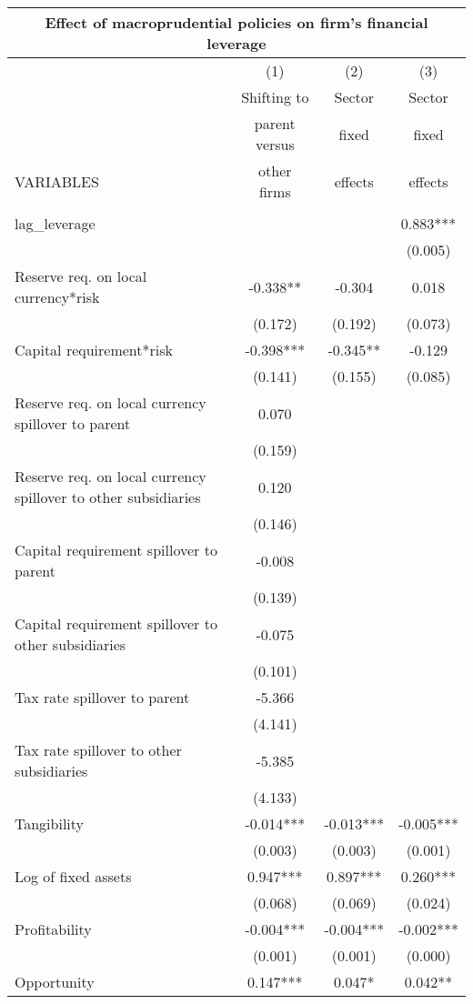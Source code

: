 \begin{tabular}{lccc}
\multicolumn{4}{c}{Effect of macroprudential policies on firm's financial leverage} \\ \hline
 & (1) & (2) & (3) \\
 & Shifting to & Sector & Sector \\
 & parent versus & fixed & fixed \\
VARIABLES & other firms & effects & effects \\ \hline
 &  &  &  \\
lag\_leverage &  &  & 0.883*** \\
 &  &  & (0.005) \\
Reserve req. on local currency*risk & -0.338** & -0.304 & 0.018 \\
 & (0.172) & (0.192) & (0.073) \\
Capital requirement*risk & -0.398*** & -0.345** & -0.129 \\
 & (0.141) & (0.155) & (0.085) \\
Reserve req. on local currency spillover to parent & 0.070 &  &  \\
 & (0.159) &  &  \\
Reserve req. on local currency spillover to other subsidiaries & 0.120 &  &  \\
 & (0.146) &  &  \\
Capital requirement spillover to parent & -0.008 &  &  \\
 & (0.139) &  &  \\
Capital requirement spillover to other subsidiaries & -0.075 &  &  \\
 & (0.101) &  &  \\
Tax rate spillover to parent & -5.366 &  &  \\
 & (4.141) &  &  \\
Tax rate spillover to other subsidiaries & -5.385 &  &  \\
 & (4.133) &  &  \\
Tangibility & -0.014*** & -0.013*** & -0.005*** \\
 & (0.003) & (0.003) & (0.001) \\
Log of fixed assets & 0.947*** & 0.897*** & 0.260*** \\
 & (0.068) & (0.069) & (0.024) \\
Profitability & -0.004*** & -0.004*** & -0.002*** \\
 & (0.001) & (0.001) & (0.000) \\
Opportunity & 0.147*** & 0.047* & 0.042** \\

\end{tabular}
